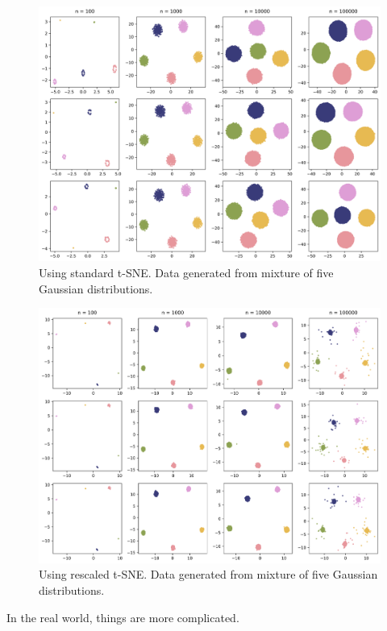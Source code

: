 \begin{figure}[h]
    \centering 
        \includegraphics[width=0.9\linewidth]{figures/rescaled/Gaussian_Mixture_standard_embedding_grid.png}
        \caption{Using standard t-SNE. Data generated from mixture of five Gaussian distributions. }
    \label{fig:Gaussian-standard}
\end{figure}

\begin{figure}[h]
    \centering 
        \includegraphics[width=0.9\linewidth]{figures/rescaled/Gaussian_Mixture_rescaled_embedding_grid.png}
        \caption{Using rescaled t-SNE. Data generated from mixture of five Gaussian distributions.}
    \label{fig:Gaussian-rescaled}
\end{figure}

In the real world, things are more complicated. 

